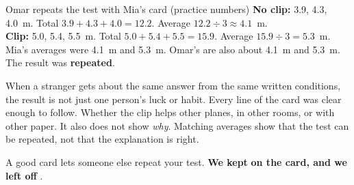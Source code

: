 \begin{worked}{Omar repeats the test with Mia's card (practice numbers)}
\textbf{No clip:} 3.9, 4.3, 4.0~m. Total $3.9+4.3+4.0=12.2$. Average $12.2\div3\approx4.1$~m.\\
\textbf{Clip:} 5.0, 5.4, 5.5~m. Total $5.0+5.4+5.5=15.9$. Average $15.9\div3=5.3$~m.\\
Mia's averages were 4.1~m and 5.3~m. Omar's are also about 4.1~m and 5.3~m. The result was \textbf{repeated}.
\end{worked}

\begin{center}
\end{center}

{When a stranger gets about the same answer from the same written conditions, the result is not just one person's luck or habit. Every line of the card was clear enough to follow.}
{Whether the clip helps other planes, in other rooms, or with other paper. It also does not show \emph{why}. Matching averages show that the test can be repeated, not that the explanation is right.}

\begin{keepbox}
A good card lets someone else repeat your test. \textbf{We kept} \wline[3.4cm] \textbf{on the card, and we left off} \wline[3.4cm].
\end{keepbox}

\clearpage

